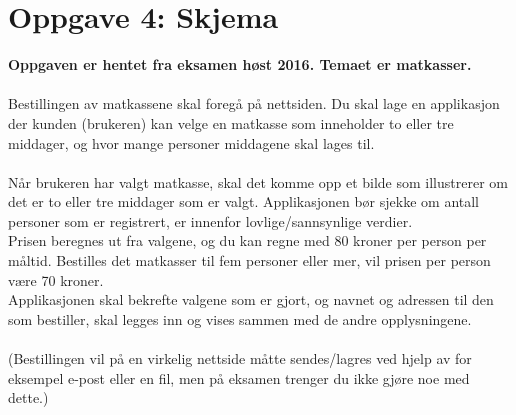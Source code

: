 \documentclass[a4paper, norsk, 10pt]{article}
\begin{document}
\section*{Oppgave 4: Skjema}
\textbf{Oppgaven er hentet fra eksamen høst 2016. Temaet er matkasser.}\\
\ \\
Bestillingen av matkassene skal foregå på nettsiden. Du skal lage en applikasjon der kunden (brukeren) kan velge en matkasse som inneholder to eller tre middager, og hvor mange personer middagene skal lages til.\\
\ \\
Når brukeren har valgt matkasse, skal det komme opp et bilde som illustrerer om det er to eller tre middager som er valgt. Applikasjonen bør sjekke om antall personer som er registrert, er innenfor lovlige/sannsynlige verdier.\\
Prisen beregnes ut fra valgene, og du kan regne med 80 kroner per person per måltid. Bestilles det matkasser til fem personer eller mer, vil prisen per person være 70 kroner.\\
Applikasjonen skal bekrefte valgene som er gjort, og navnet og adressen til den som bestiller, skal legges inn og vises sammen med de andre opplysningene.\\
\ \\
(Bestillingen vil på en virkelig nettside måtte sendes/lagres ved hjelp av for eksempel e-post eller en fil, men på eksamen trenger du ikke gjøre noe med dette.)\\
\end{document}
